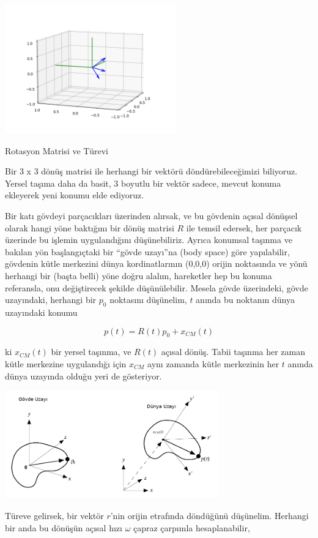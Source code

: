 \documentclass[12pt,fleqn]{article}\usepackage{../../common}
\begin{document}
\includegraphics[width=20em]{phy_005_basics_04_02.png}

Rotasyon Matrisi ve Türevi

Bir 3 x 3 dönüş matrisi ile herhangi bir vektörü döndürebileceğimizi biliyoruz.
Yersel taşıma daha da basit, 3 boyutlu bir vektör sadece, mevcut konuma
ekleyerek yeni konumu elde ediyoruz.

Bir katı gövdeyi parçacıkları üzerinden alırsak, ve bu gövdenin açısal dönüşsel
olarak hangi yöne baktığını bir dönüş matrisi $R$ ile temsil edersek, her
parçacık üzerinde bu işlemin uygulandığını düşünebiliriz. Ayrıca konumsal
taşınma ve bakılan yön başlangıçtaki bir ``gövde uzayı''na (body space) göre
yapılabilir, gövdenin kütle merkezini dünya kordinatlarının (0,0,0) orijin
noktasında ve yönü herhangi bir (başta belli) yöne doğru alalım, hareketler hep
bu konuma referansla, onu değiştirecek şekilde düşünülebilir.  Mesela gövde
üzerindeki, gövde uzayındaki, herhangi bir $p_0$ noktasını düşünelim, $t$ anında
bu noktanın dünya uzayındaki konumu

$$
p(t) = R(t) p_0 + x_{CM}(t)
$$

ki $x_{CM}(t)$ bir yersel taşınma, ve $R(t)$ açısal dönüş. Tabii taşınma her
zaman kütle merkezine uygulandığı için $x_{CM}$ aynı zamanda kütle merkezinin
her $t$ anında dünya uzayında olduğu yeri de gösteriyor.

\includegraphics[width=25em]{phy_005_basics_04_04.png}

Türeve gelirsek, bir vektör $r$'nin orijin etrafında döndüğünü
düşünelim. Herhangi bir anda bu dönüşün açısal hızı $\omega$ çapraz çarpımla
hesaplanabilir,
\end{document}
